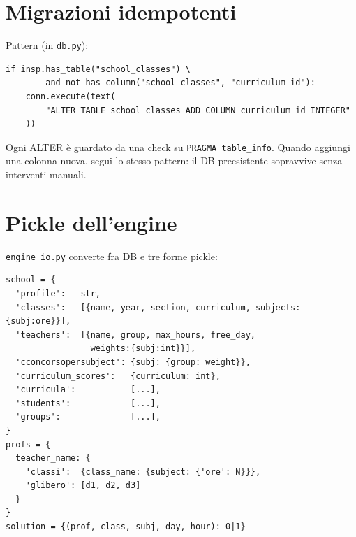 \section{Migrazioni idempotenti}

Pattern (in \texttt{db.py}):

\begin{lstlisting}[style=py]
if insp.has_table("school_classes") \
        and not has_column("school_classes", "curriculum_id"):
    conn.execute(text(
        "ALTER TABLE school_classes ADD COLUMN curriculum_id INTEGER"
    ))
\end{lstlisting}

Ogni ALTER \`e guardato da una check su \texttt{PRAGMA table\_info}.
Quando aggiungi una colonna nuova, segui lo stesso pattern: il DB
preesistente sopravvive senza interventi manuali.

\section{Pickle dell'engine}

\texttt{engine\_io.py} converte fra DB e tre forme pickle:

\begin{lstlisting}[style=py]
school = {
  'profile':   str,
  'classes':   [{name, year, section, curriculum, subjects:{subj:ore}}],
  'teachers':  [{name, group, max_hours, free_day,
                 weights:{subj:int}}],
  'cconcorsopersubject': {subj: {group: weight}},
  'curriculum_scores':   {curriculum: int},
  'curricula':           [...],
  'students':            [...],
  'groups':              [...],
}
profs = {
  teacher_name: {
    'classi':  {class_name: {subject: {'ore': N}}},
    'glibero': [d1, d2, d3]
  }
}
solution = {(prof, class, subj, day, hour): 0|1}
\end{lstlisting}

